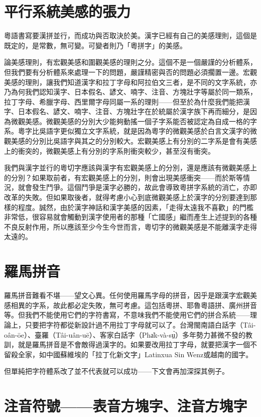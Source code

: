 \documentclass[a5paper, 10pt, openany]{book} %
\begin{document}
\section{平行系統美感的張力}

粵語書寫要漢拼並行，而成功與否取決於美。漢字已經有自己的美感理則，這個是既定的，是常數，無可變。可變者則乃「粵拼字」的美感。

論美感理則，有宏觀美感和圍觀美感的理則之分。這個不是一個嚴謹的分析體系，但我們要有分析體系來處理一下的問題，嚴謹精密與否的問題必須擱置一邊。宏觀美感的理則，讓我們知道漢字和拉丁字母和阿拉伯文三者，是不同的文字系統，亦乃為何我們認知漢字、日本假名、諺文、喃字、注音、方塊壯字等屬於同一類系，拉丁字母、希臘字母、西里爾字母同屬一系的理則——但至於為什麼我們能把漢字、日本假名、諺文、喃字、注音、方塊壯字在於統屬於漢字族下再而細分，是因為微觀美感。微觀美感的分別大少能夠動搖一個子字系能否被認定為自成一格的字系。粵字比吳語字更似獨立文字系統，就是因為粵字的微觀美感於白言文漢字的微觀美感的分別比吳語字與其之的分別較大。宏觀美感上有分別的二字系是會有美感上的衝突的，微觀美感上有分別的字系則衝突較少，甚至沒有衝突。

我們與漢字並行的粵切字應該與漢字有宏觀美感上的分別，還是應該有微觀美感上的分別？如果取前者，有宏觀美感上的分別，則會出現美感衝突——而於斯等情況，就會發生鬥爭。這個鬥爭是漢字必勝的，故此會導致粵拼字系統的消亡，亦即改革的失敗。但如果取後者，就得考慮小心到底微觀美感上於漢字的分別要達到那樣的程度。誠然，由於漢字神話和漢字美感的因素，「走得太遠我不喜歡」的門檻非常低，很容易就會觸動到漢字使用者的那種「亡國感」繼而產生上述提到的各種不良反射作用，所以應該至少今生今世而言，粵切字的微觀美感是不能離漢字走得太遠的。

\section{羅馬拼音}

羅馬拼音難看不堪——望文心異。任何使用羅馬字母的拼音，因乎是跟漢字宏觀美感相異的字系，故此都必定失敗，無可考慮。這包括粵拼、耶魯粵語拼、廣州拼音等。但我們不能使用它們的字符書寫，不意味我們不能使用它們的拼合系統——理論上，只要把字符都從新設計過不用拉丁字母就可以了。台灣閩南語白話字（Tâi-oân-ōe）、臺羅（Tâi-uân-uē）、客家白話字（{\taigi Pha̍k-và-sṳ̀}）多年勢力甚微不發的教訓，就是羅馬拼音是不會敵得過漢字的。如果要改用拉丁字母，就要把漢字一個不留殺全家，如中國蘇維埃的「拉丁化新文字」Latinxua Sin Wenz或越南的國字。


但單純把字符體系改了並不代表就可以成功——下文會再加深探其例子。

\section{注音符號——表音方塊字、注音方塊字}
\end{document}
